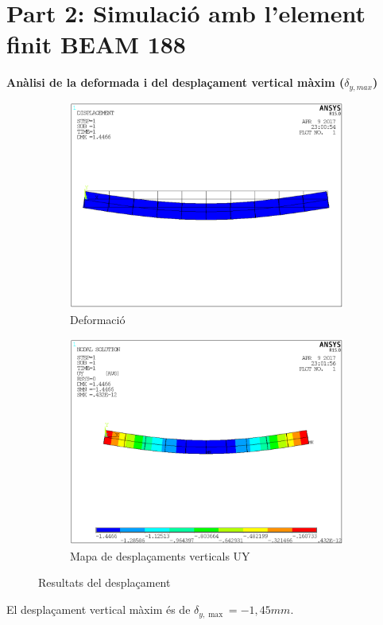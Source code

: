 \documentclass[a4paper]{article}
\def\imgS{0.42\textwidth}
\begin{document}
\section{Part 2: Simulació amb l'element finit BEAM 188}
\textbf{Anàlisi de la deformada i del desplaçament vertical màxim ($\delta_{y,max}$)}

\begin{figure}[H]
	\begin{subfigure}{\imgS}
		\includegraphics[width=\textwidth]{images/b_deformed}
		\caption{Deformació}
		\label{fig:b_deformed}
	\end{subfigure}
	\hfill
	\begin{subfigure}{\imgS}
		\includegraphics[width=\textwidth]{images/b_UY}
		\caption{Mapa de desplaçaments verticals UY}
		\label{fig:b_UY}
	\end{subfigure}
	\caption{Resultats del desplaçament}
	\label{fig:b_displacement}
\end{figure}
El desplaçament vertical màxim és de $\delta_{y,\max} = -1,45mm$. 
\end{document}

